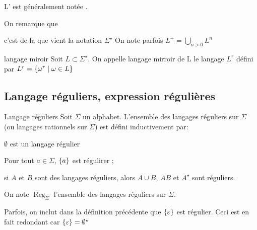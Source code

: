 \documentclass[a4paper,french,bookmarks]{book}
\DeclareMathOperator{\Reg}{Reg}
\begin{document}
    \begin{notation}
        L' est généralement notée .
    \end{notation}
    
    On remarque que
    \begin{enumerate}
        \itt c'est de la que vient la notation $\Sigma^\star$
        \itt On note parfois $L^+ = \bigcup_{n > 0} L^n$
    \end{enumerate}
    
    \begin{definition}{langage miroir}{}
        Soit $L \subset \Sigma^\star$. On appelle langage mirroir de L le langage $L^r$ défini par $L^r = \left\{\omega^r \;\middle\vert\; \omega \in L\right\}$
        
    \end{definition}
    
    \subsection{Langage réguliers, expression régulières}
    
    \begin{definition}{Langage réguliers}{} 
        Soit $\Sigma$ un alphabet. L'ensemble des langages réguliers sur $\Sigma$ (ou langages rationnels sur $\Sigma$) est défini inductivement par: 
        \begin{enumerate}
            \itast $\emptyset$ est un langage régulier
            
            \itast  Pour tout $a \in \Sigma$, $\left\{a\right\}$ est régulirer ;
            
            \itast si $A$ et $B$ sont des langages réguliers, alors $A \cup B$, $AB$ et $A^\star$ sont réguliers.
            
        \end{enumerate}
    \end{definition}
    \begin{notation}
        On note $\Reg_\Sigma$ l'ensemble des langages réguliers sur $\Sigma$.
    \end{notation}
    
    Parfois, on inclut dans la définition précédente que $\left\{\varepsilon\right\}$ est régulier. Ceci est en fait redondant car $\left\{\varepsilon\right\} = \emptyset^\star$
    
\end{document}

